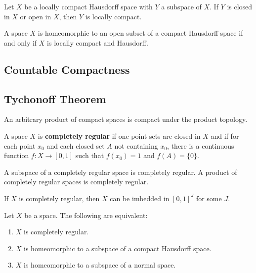   \begin{corollary}
    Let $X$ be a locally compact Hausdorff space with $Y$ a subspace of $X$. If $Y$ is closed in $X$ or open in $X$, then $Y$ is locally compact. 
  \end{corollary}

  \begin{corollary}
    A space $X$ is homeomorphic to an open subset of a compact Hausdorff space if and only if $X$ is locally compact and Hausdorff. 
  \end{corollary}

\subsection{Countable Compactness}

\subsection{Tychonoff Theorem}

  \begin{theorem}
    An arbitrary product of compact spaces is compact under the product topology. 
  \end{theorem}

  \begin{definition}
    A space $X$ is \textbf{completely regular} if one-point sets are closed in $X$ and if for each point $x_0$ and each closed set $A$ not containing $x_0$, there is a continuous function $f: X \longrightarrow [0,1]$ such that $f(x_0) = 1$ and $f(A) = \{0\}$. 
  \end{definition}

  \begin{theorem}
    A subspace of a completely regular space is completely regular. A product of completely regular spaces is completely regular. 
  \end{theorem}

  \begin{theorem}
    If $X$ is completely regular, then $X$ can be imbedded in $[0,1]^J$ for some $J$. 
  \end{theorem}

  \begin{corollary}
    Let $X$ be a space. The following are equivalent: 
    \begin{enumerate}
      \item $X$ is completely regular. 
      \item $X$ is homeomorphic to a subspace of a compact Hausdorff space. 
      \item $X$ is homeomorphic to a subspace of a normal space. 
    \end{enumerate}
  \end{corollary}

